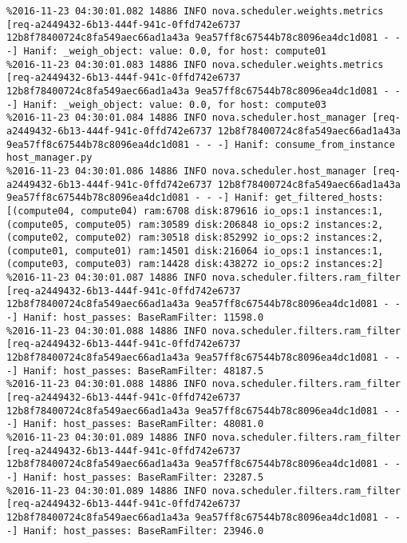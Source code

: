 \begin{lstlisting}[frame=single, caption={The filter scheduler log trace for 10 virtual instances}, label={lst:filterschedulercodetracelog10vi}, escapechar=|]
%2016-11-23 04:30:01.082 14886 INFO nova.scheduler.weights.metrics [req-a2449432-6b13-444f-941c-0ffd742e6737 12b8f78400724c8fa549aec66ad1a43a 9ea57ff8c67544b78c8096ea4dc1d081 - - -] Hanif: _weigh_object: value: 0.0, for host: compute02
%2016-11-23 04:30:01.082 14886 INFO nova.scheduler.weights.metrics [req-a2449432-6b13-444f-941c-0ffd742e6737 12b8f78400724c8fa549aec66ad1a43a 9ea57ff8c67544b78c8096ea4dc1d081 - - -] Hanif: _weigh_object: value: 0.0, for host: compute01
%2016-11-23 04:30:01.083 14886 INFO nova.scheduler.weights.metrics [req-a2449432-6b13-444f-941c-0ffd742e6737 12b8f78400724c8fa549aec66ad1a43a 9ea57ff8c67544b78c8096ea4dc1d081 - - -] Hanif: _weigh_object: value: 0.0, for host: compute03
%2016-11-23 04:30:01.084 14886 INFO nova.scheduler.host_manager [req-a2449432-6b13-444f-941c-0ffd742e6737 12b8f78400724c8fa549aec66ad1a43a 9ea57ff8c67544b78c8096ea4dc1d081 - - -] Hanif: consume_from_instance host_manager.py
%2016-11-23 04:30:01.086 14886 INFO nova.scheduler.host_manager [req-a2449432-6b13-444f-941c-0ffd742e6737 12b8f78400724c8fa549aec66ad1a43a 9ea57ff8c67544b78c8096ea4dc1d081 - - -] Hanif: get_filtered_hosts: [(compute04, compute04) ram:6708 disk:879616 io_ops:1 instances:1, (compute05, compute05) ram:30589 disk:206848 io_ops:2 instances:2, (compute02, compute02) ram:30518 disk:852992 io_ops:2 instances:2, (compute01, compute01) ram:14501 disk:216064 io_ops:1 instances:1, (compute03, compute03) ram:14428 disk:438272 io_ops:2 instances:2]
%2016-11-23 04:30:01.087 14886 INFO nova.scheduler.filters.ram_filter [req-a2449432-6b13-444f-941c-0ffd742e6737 12b8f78400724c8fa549aec66ad1a43a 9ea57ff8c67544b78c8096ea4dc1d081 - - -] Hanif: host_passes: BaseRamFilter: 11598.0
%2016-11-23 04:30:01.088 14886 INFO nova.scheduler.filters.ram_filter [req-a2449432-6b13-444f-941c-0ffd742e6737 12b8f78400724c8fa549aec66ad1a43a 9ea57ff8c67544b78c8096ea4dc1d081 - - -] Hanif: host_passes: BaseRamFilter: 48187.5
%2016-11-23 04:30:01.088 14886 INFO nova.scheduler.filters.ram_filter [req-a2449432-6b13-444f-941c-0ffd742e6737 12b8f78400724c8fa549aec66ad1a43a 9ea57ff8c67544b78c8096ea4dc1d081 - - -] Hanif: host_passes: BaseRamFilter: 48081.0
%2016-11-23 04:30:01.089 14886 INFO nova.scheduler.filters.ram_filter [req-a2449432-6b13-444f-941c-0ffd742e6737 12b8f78400724c8fa549aec66ad1a43a 9ea57ff8c67544b78c8096ea4dc1d081 - - -] Hanif: host_passes: BaseRamFilter: 23287.5
%2016-11-23 04:30:01.089 14886 INFO nova.scheduler.filters.ram_filter [req-a2449432-6b13-444f-941c-0ffd742e6737 12b8f78400724c8fa549aec66ad1a43a 9ea57ff8c67544b78c8096ea4dc1d081 - - -] Hanif: host_passes: BaseRamFilter: 23946.0

\end{lstlisting}
